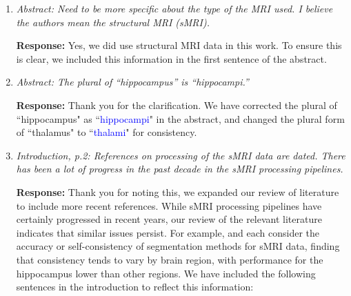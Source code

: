 \documentclass[12pt]{article}
\theoremstyle{definition}
\newcommand{\revision}[1]{\textcolor{blue}{#1}}
\begin{document}
\begin{enumerate}
We have attempted to investigate this topic in our simulations, as simulation runs with a follow-up duration of 1 year and interval between visits of 6 months will yield a simulated dataset with 3 observations, the minimum needed to fit a nonlinear function describing temporal change. We have included an expanded description of the results in this setting in Section 4, as follows:

\revision{Note that simulation results with duration set to 1 year and between-visit intervals set to 0.5 years yield simulated datasets with only 3 visits, allowing assessment of performance of the proposed method with limited time points.}

We also include an additional comment in Section 6:

\revision{Additionally, the method is applicable when a limited number of time points are observed, as long as those time points sufficiently characterize the properties of the longitudinal change function.}

{\it Specific comments}

\item \textit{Abstract:    Need to be more specific about the type of the MRI used. I believe the authors mean the structural MRI (sMRI).}

{\bf Response:}
Yes, we did use structural MRI data in this work. To ensure this is clear, we included this information in
the first sentence of the abstract.

\item \textit{Abstract:    The plural of “hippocampus” is “hippocampi.”}

 {\bf Response:}
 Thank you for the clarification. We have corrected the plural of ``hippocampus" as ``\revision{hippocampi}" in the abstract, and changed the plural form of ``thalamus" to ``\revision{thalami}" for consistency.

\item \textit{Introduction, p.2:  References on processing of the sMRI data are dated. There has been a lot of progress in the past decade in the sMRI processing pipelines.}

{\bf Response:} Thank you for noting this, we expanded our review of literature to include more recent references. While sMRI processing pipelines have certainly progressed in recent years, our review of the relevant literature
indicates that similar issues persist. For example, \cite{akudjedu2018comparative} and \cite{quilis-sancho2020comparative} each consider the accuracy or self-consistency of segmentation methods for sMRI data, finding that consistency tends to vary by brain region, with performance for the hippocampus lower than other regions. We have included the following sentences in the introduction to reflect this information:


\end{enumerate}
\end{document}
